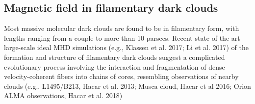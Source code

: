 \documentclass[11pt]{amsart}
\begin{document}
\subsection{Magnetic field in filamentary dark clouds}

Most massive molecular dark clouds are found to be in filamentary form, with lengths ranging from a couple to more than 10 parsecs. 
Recent state-of-the-art large-scale ideal MHD simulations (e.g., Klassen et al. 2017; Li et al. 2017) of the formation and structure 
of filamentary dark clouds suggest a complicated evolutionary process involving the interaction and fragmentation of 
dense velocity-coherent fibers into chains of cores, resembling observations of nearby clouds (e.g., L1495/B213, Hacar et al. 2013; Musca cloud, Hacar et al 2016; 
Orion ALMA observations, Hacar et al. 2018)
\end{document}
